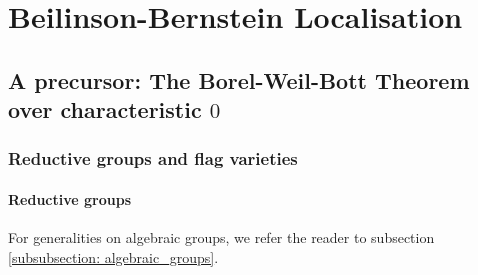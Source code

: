     \section{Beilinson-Bernstein Localisation}
        \subsection{A precursor: The Borel-Weil-Bott Theorem over characteristic \texorpdfstring{$0$}{}}
            \subsubsection{Reductive groups and flag varieties}
                \paragraph{Reductive groups}
                    For generalities on algebraic groups, we refer the reader to subsection \ref{subsubsection: algebraic_groups}.
                    
